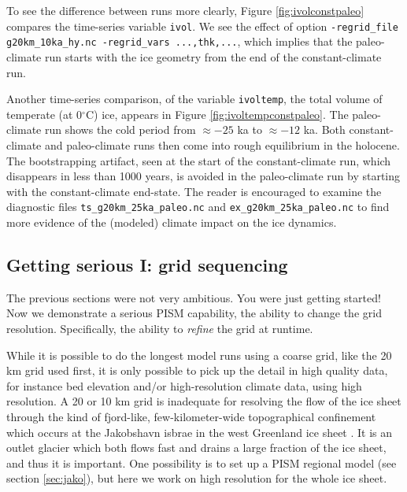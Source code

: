 To see the difference between runs more clearly, Figure \ref{fig:ivolconstpaleo} compares the time-series variable \texttt{ivol}.  We see the effect of option \verb|-regrid_file g20km_10ka_hy.nc -regrid_vars ...,thk,...|, which implies that the paleo-climate run starts with the ice geometry from the end of the constant-climate run.

Another time-series comparison, of the variable \verb|ivoltemp|, the total volume of temperate (at 0$^\circ$C) ice, appears in Figure \ref{fig:ivoltempconstpaleo}.  The paleo-climate run shows the cold period from $\approx -25$ ka to $\approx -12$ ka.  Both constant-climate and paleo-climate runs then come into rough equilibrium in the holocene.  The bootstrapping artifact, seen at the start of the constant-climate run, which disappears in less than 1000 years, is avoided in the paleo-climate run by starting with the constant-climate end-state.  The reader is encouraged to examine the diagnostic files \texttt{ts_g20km_25ka_paleo.nc} and \texttt{ex_g20km_25ka_paleo.nc} to find more evidence of the (modeled) climate impact on the ice dynamics.


\subsection{Getting serious I: grid sequencing}  \label{subsect:gridseq}  

The previous sections were not very ambitious.  You were just getting started!  Now we demonstrate a serious PISM capability, the ability to change the grid resolution.  Specifically, the ability to \emph{refine} the grid at runtime.

While it is possible to do the longest model runs using a coarse grid, like the 20 km grid used first, it is only possible to pick up the detail in high quality data, for instance bed elevation and/or high-resolution climate data, using high resolution.  A 20 or 10 km grid is inadequate for resolving the flow of the ice sheet through the kind of fjord-like, few-kilometer-wide topographical confinement which occurs at the Jakobshavn isbrae in the west Greenland ice sheet \cite{Joughinetal08}.  It is an outlet glacier which both flows fast and drains a large fraction of the ice sheet, and thus it is important.  One possibility is to set up a PISM regional model (see section \ref{sec:jako}), but here we work on high resolution for the whole ice sheet.

